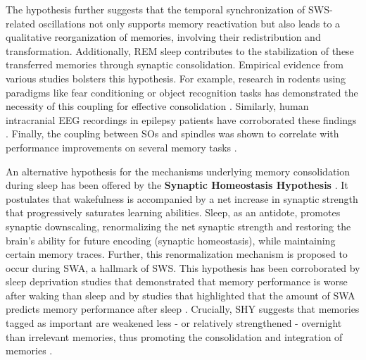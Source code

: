 The hypothesis further suggests that the temporal synchronization of SWS-related oscillations not only supports memory reactivation but also leads to a qualitative reorganization of memories, involving their redistribution and transformation. Additionally, REM sleep contributes to the stabilization of these transferred memories through synaptic consolidation. Empirical evidence from various studies bolsters this hypothesis. For example, research in rodents using paradigms like fear conditioning or object recognition tasks has demonstrated the necessity of this coupling for effective consolidation \parencite{maingret_hippocampo-cortical_2016, latchoumane_thalamic_2017}. Similarly, human intracranial EEG recordings in epilepsy patients have corroborated these findings \parencite{helfrich_bidirectional_2019, jiang_posterior_2019}. Finally, the coupling between SOs and spindles was shown to correlate with performance improvements on several memory tasks \parencite[for instance][]{schreiner_endogenous_2021, muehlroth_precise_2019, hahn_slow_2020}.

An alternative hypothesis for the mechanisms underlying memory consolidation during sleep has been offered by the \textbf{Synaptic Homeostasis Hypothesis} \parencite[SHY,][Figure \ref{fig:SHY}]{tononi_sleep_2003,tononi_sleep_2006}. It postulates that wakefulness is accompanied by a net increase in synaptic strength that progressively saturates learning abilities. Sleep, as an antidote, promotes synaptic downscaling, renormalizing the net synaptic strength and restoring the brain’s ability for future encoding (synaptic homeostasis), while maintaining certain memory traces. Further, this renormalization mechanism is proposed to occur during SWA, a hallmark of SWS. This hypothesis has been corroborated by sleep deprivation studies that demonstrated that memory performance is worse after waking than sleep \parencite{ashton_sleep_2020, gais_sleep_2006, yang_repeated_2012} and by studies that highlighted that the amount of SWA predicts memory performance after sleep \parencite{huber_arm_2006, ferrarelli_increase_2019}.
Crucially, SHY suggests that memories tagged as important are weakened less - or relatively strengthened - overnight than irrelevant memories, thus promoting the consolidation and integration of memories \parencite{tononi_sleep_2003,tononi_sleep_2006,tononi_sleep_2014, wilhelm_sleep_2014}.

